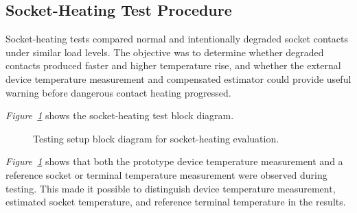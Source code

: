 \subsection{Socket-Heating Test Procedure}
\label{sec:ch3-heating-test-procedure}

Socket-heating tests compared normal and intentionally degraded socket
contacts under similar load levels. The objective was to determine whether
degraded contacts produced faster and higher temperature rise, and whether the
external device temperature measurement and compensated estimator could provide useful warning before
dangerous contact heating progressed.

\textit{Figure~\ref{fig:ch3-heating-block}} shows the socket-heating test block
diagram.
\begin{figure}[H]
  \centering
  \caption{Testing setup block diagram for socket-heating evaluation.}
  \label{fig:ch3-heating-block}
\end{figure}

\textit{Figure~\ref{fig:ch3-heating-block}} shows that both the prototype device
temperature measurement and a reference socket or terminal temperature measurement were
observed during testing. This made it possible to distinguish device temperature measurement,
estimated socket temperature, and reference terminal temperature in the
results.

